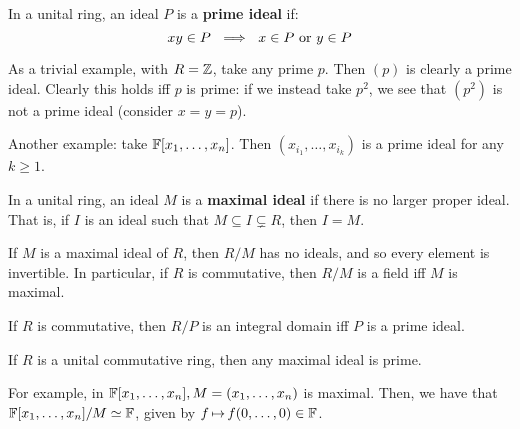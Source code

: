 \begin{defn}
    In a unital ring, an ideal $ P $ is a \textbf{prime ideal} if:
    \begin{equation*}
        xy \in P \ \implies \ x \in P \textrm{ or } y \in P
    \end{equation*}
\end{defn}
As a trivial example, with $ R = \mathbb{Z} $, take any prime $ p $.
Then $ (p) $ is clearly a prime ideal. Clearly this holds iff $ p $ is prime: if we instead
take $ p^{2} $, we see that $ (p^{2}) $ is not a prime ideal (consider $ x = y = p $).

Another example: take $ \mathbb{F}[x_{1}, \dots, x_{n}] $.
Then $ (x_{i_{1}}, \dots, x_{i_{k}}) $ is a prime ideal for any $ k \geq 1 $.

\begin{defn}
    In a unital ring, an ideal $ M $ is a \textbf{maximal ideal} if there is no larger proper
    ideal. That is, if $ I $ is an ideal such that $ M \subseteq I \subsetneq R $, then $ I = M $.
\end{defn}

\begin{thm}
    If $ M $ is a maximal ideal of $ R $, then $ R/M $ has no ideals, and so every element is
    invertible. \vsp
    In particular, if $ R $ is commutative, then $ R/M $ is a field iff $ M $ is maximal.
\end{thm}

\begin{thm}
    If $ R $ is commutative, then $ R/P $ is an integral domain iff $ P $ is a prime ideal.
\end{thm}

\begin{crll}
    If $ R $ is a unital commutative ring, then any maximal ideal is prime.
\end{crll}

For example, in $ \mathbb{F}[x_{1}, \dots, x_{n}], M = (x_{1}, \dots, x_{n}) $ is maximal.
Then, we have that $ \mathbb{F}[x_{1}, \dots, x_{n}]/M \simeq \mathbb{F} $, given by
$ f \operatorname{\mapsto} f(0, \dots, 0) \in \mathbb{F} $.
